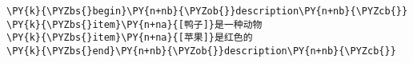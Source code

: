 \begin{Verbatim}[commandchars=\\\{\}]
\PY{k}{\PYZbs{}begin}\PY{n+nb}{\PYZob{}}description\PY{n+nb}{\PYZcb{}}
\PY{k}{\PYZbs{}item}\PY{n+na}{[鸭子]}是一种动物
\PY{k}{\PYZbs{}item}\PY{n+na}{[苹果]}是红色的
\PY{k}{\PYZbs{}end}\PY{n+nb}{\PYZob{}}description\PY{n+nb}{\PYZcb{}}
\end{Verbatim}
